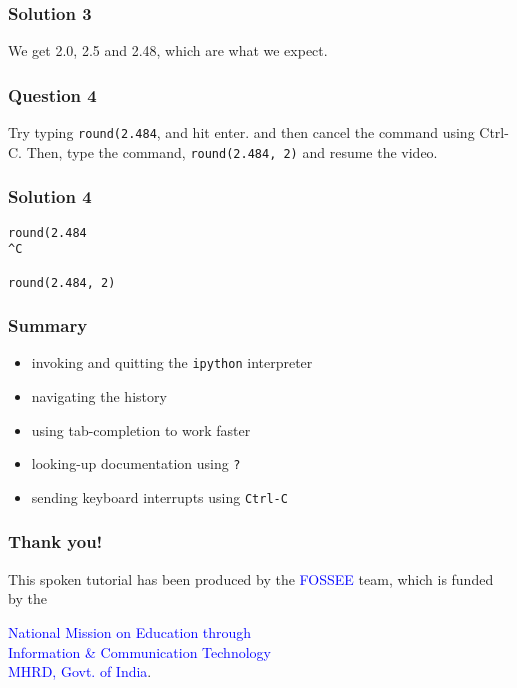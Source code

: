 \documentclass[presentation]{beamer}
\begin{document}
\begin{frame}
\frametitle{Solution 3}
\label{sec-7}

  We get 2.0, 2.5 and 2.48, which are what we expect. 
\end{frame}
\begin{frame}
\frametitle{Question 4}
\label{sec-8}

  Try typing \texttt{round(2.484}, and hit enter. and then cancel the command
  using Ctrl-C. Then, type the command, \texttt{round(2.484, 2)} and resume
  the video.
\end{frame}
\begin{frame}[fragile]
\frametitle{Solution 4}
\label{sec-9}

\begin{verbatim}
round(2.484 
^C

round(2.484, 2)
\end{verbatim}
\end{frame}
\begin{frame}
\frametitle{Summary}
\label{sec-10}

\begin{itemize}
\item invoking and quitting the \texttt{ipython} interpreter
\item navigating the history
\item using tab-completion to work faster
\item looking-up documentation using \texttt{?}
\item sending keyboard interrupts using \texttt{Ctrl-C}
\end{itemize}
\end{frame}
\begin{frame}
\frametitle{Thank you!}
\label{sec-11}

  \begin{block}{}
  \begin{center}
  This spoken tutorial has been produced by the
  \textcolor{blue}{FOSSEE} team, which is funded by the 
  \end{center}
  \begin{center}
    \textcolor{blue}{National Mission on Education through \\
      Information \& Communication Technology \\ 
      MHRD, Govt. of India}.
  \end{center}  
  \end{block}
\end{frame}
\end{document}
